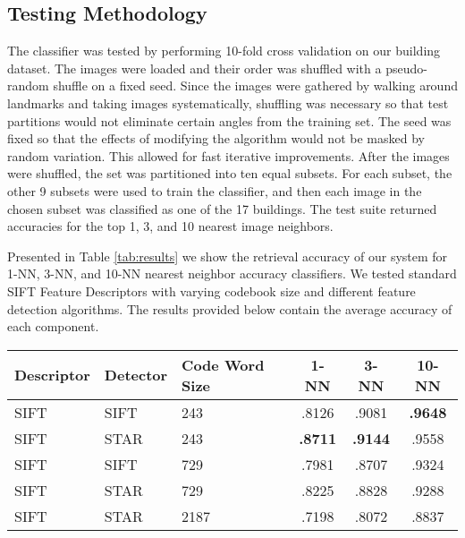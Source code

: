 \subsection{Testing Methodology}

The classifier was tested by performing 10-fold cross validation on our building dataset. 
The images were loaded and their order was shuffled with a pseudo-random shuffle on a fixed seed. 
Since the images were gathered by walking around landmarks and taking images systematically, shuffling was necessary so that test partitions would not eliminate certain angles from the training set. 
The seed was fixed so that the effects of modifying the algorithm would not be masked by random variation. This allowed for fast iterative improvements. After the images were shuffled, the set was partitioned into ten equal subsets. 
For each subset, the other 9 subsets were used to train the classifier, and then each image in the chosen subset was classified as one of the 17 buildings. 
The test suite returned accuracies for the top 1, 3, and 10 nearest image neighbors.


Presented in Table \ref{tab:results} we show the retrieval accuracy of our system for 1-NN, 3-NN, and 10-NN nearest neighbor accuracy classifiers.
We tested standard SIFT Feature Descriptors with varying codebook size and different feature detection algorithms.
The results provided below contain the average accuracy of each component.

\begin{table*}[ht!]
\label{tab:results}
\centering
\begin{tabular}{| l | l | l | c | c | c |}
\hline
Descriptor & Detector & Code Word Size & 1-NN & 3-NN & 10-NN\\ \hline
SIFT & SIFT & 243 & .8126 & .9081  & \textbf{.9648}  \\ 
SIFT & STAR & 243 & \textbf{.8711} & \textbf{.9144} & .9558 \\ 
SIFT & SIFT & 729 & .7981 & .8707 & .9324 \\ 
SIFT & STAR & 729 & .8225 & .8828 & .9288 \\ 
SIFT & STAR & 2187 & .7198 & .8072 & .8837\\ \hline
\end{tabular}
\vspace*{10pt}
\caption{Retrieval Accuracy}
\end{table*}

